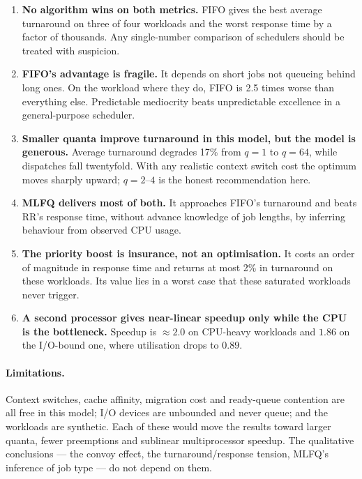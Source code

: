 \documentclass[11pt,a4paper]{article}
\begin{document}
\begin{enumerate}\itemsep3pt
  \item \textbf{No algorithm wins on both metrics.} FIFO gives the best average
        turnaround on three of four workloads and the worst response time by a
        factor of thousands. Any single-number comparison of schedulers should
        be treated with suspicion.

  \item \textbf{FIFO's advantage is fragile.} It depends on short jobs not
        queueing behind long ones. On the workload where they do, FIFO is 2.5
        times worse than everything else. Predictable mediocrity beats
        unpredictable excellence in a general-purpose scheduler.

  \item \textbf{Smaller quanta improve turnaround in this model, but the model
        is generous.} Average turnaround degrades 17\% from $q{=}1$ to
        $q{=}64$, while dispatches fall twentyfold. With any realistic context
        switch cost the optimum moves sharply upward; $q{=}2$--$4$ is the
        honest recommendation here.

  \item \textbf{MLFQ delivers most of both.} It approaches FIFO's turnaround
        and beats RR's response time, without advance knowledge of job lengths,
        by inferring behaviour from observed CPU usage.

  \item \textbf{The priority boost is insurance, not an optimisation.} It costs
        an order of magnitude in response time and returns at most 2\% in
        turnaround on these workloads. Its value lies in a worst case that
        these saturated workloads never trigger.

  \item \textbf{A second processor gives near-linear speedup only while the CPU
        is the bottleneck.} Speedup is $\approx 2.0$ on CPU-heavy workloads and
        $1.86$ on the I/O-bound one, where utilisation drops to $0.89$.
\end{enumerate}

\paragraph{Limitations.} Context switches, cache affinity, migration cost and
ready-queue contention are all free in this model; I/O devices are unbounded and
never queue; and the workloads are synthetic. Each of these would move the
results toward larger quanta, fewer preemptions and sublinear multiprocessor
speedup. The qualitative conclusions --- the convoy effect, the
turnaround/response tension, MLFQ's inference of job type --- do not depend on
them.
\end{document}
